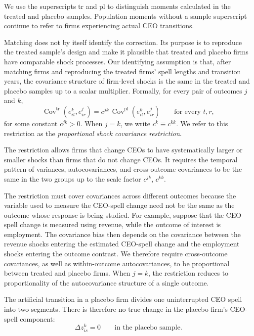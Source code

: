 \documentclass[11pt,a4paper]{article}
\begin{document}
We use the superscripts $\mathrm{tr}$ and $\mathrm{pl}$ to distinguish
moments calculated in the treated and placebo samples. Population
moments without a sample superscript continue to refer to firms
experiencing actual CEO transitions.

Matching does not by itself identify the correction. Its purpose is to
reproduce the treated sample's design and make it plausible that
treated and placebo firms have comparable shock processes. Our identifying assumption is that, after matching firms and
reproducing the treated firms' spell lengths and transition years, the
covariance structure of firm-level shocks is the same in the treated
and placebo samples up to a scalar multiplier. Formally, for every pair of outcomes $j$
and $k$,
\begin{equation}
\operatorname{Cov}^{\mathrm{tr}}\!\left(
e_{it}^{k},e_{ir}^{j}
\right)
=
c^{jk}\,
\operatorname{Cov}^{\mathrm{pl}}\!\left(
e_{it}^{k},e_{ir}^{j}
\right)
\qquad
\text{for every }t,r,
\label{eq:proportional_shock_covariance}
\end{equation}
for some constant $c^{jk}>0$.
When $j=k$, we write $c^k \equiv c^{kk}$.
We refer to this restriction as the
\emph{proportional shock covariance restriction}.

The restriction allows firms that change CEOs to have systematically
larger or smaller shocks than firms that do not change CEOs. It
requires the temporal pattern of variances, autocovariances, and
cross-outcome covariances to be the same in the two groups up to the
 scale factor $c^{jk}$, $c^{kk}$.

The restriction must cover covariances across different outcomes
because the variable used to measure the CEO-spell change need not be
the same as the outcome whose response is being studied. For example,
suppose that the CEO-spell change is measured using revenue, while the
outcome of interest is employment. The covariance bias then depends on
the covariance between the revenue shocks entering the estimated
CEO-spell change and the employment shocks entering the outcome
contrast. We therefore require cross-outcome covariances, as well as
within-outcome autocovariances, to be proportional between treated and
placebo firms. When $j=k$, the restriction reduces to proportionality
of the autocovariance structure of a single outcome.




The artificial transition in a placebo firm divides one uninterrupted
CEO spell into two segments. There is therefore no true change in the
placebo firm's CEO-spell component:
\begin{equation}
\Delta z_{is}^{k}=0
\qquad
\text{in the placebo sample}.
\label{eq:placebo_true_change}
\end{equation}
\end{document}
